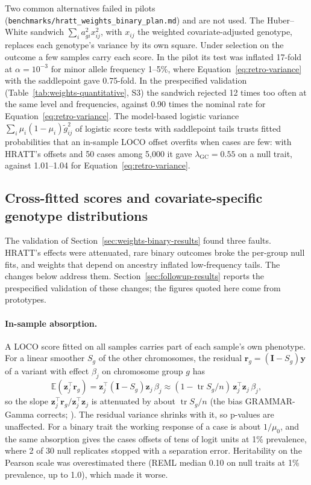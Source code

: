 \documentclass[11pt]{article}
\newcommand{\y}{\mathbf{y}}
\newcommand{\z}{\mathbf{z}}
\newcommand{\I}{\mathbf{I}}
\newcommand{\lgc}{\lambda_{\mathrm{GC}}}
\newcommand{\E}{\mathbb{E}}
\newcommand{\tr}{\operatorname{tr}}
\newcommand{\code}[1]{\texttt{#1}}
\begin{document}
Two common alternatives failed in pilots
(\code{benchmarks/}\allowbreak\code{hratt\_weights\_binary\_plan.md}) and are
not used. The
Huber--White sandwich $\sum_i a_{gi}^2x_{ij}^2$, with $x_{ij}$ the
weighted covariate-adjusted genotype, replaces each genotype's variance by
its own square. Under selection on the outcome a few samples carry each
score. In the pilot its test was inflated 17-fold at $\alpha=10^{-3}$ for
minor allele frequency 1--5\%, where Equation~\eqref{eq:retro-variance} with
the saddlepoint gave 0.75-fold. In the prespecified validation
(Table~\ref{tab:weights-quantitative}, S3) the sandwich rejected 12 times too
often at the same level and frequencies, against 0.90 times the nominal rate
for Equation~\eqref{eq:retro-variance}. The model-based logistic variance
$\sum_i\mu_i(1-\mu_i)\tilde g_{ij}^2$ of logistic score tests with
saddlepoint tails \citep{dey2017,zhou2018,hof2025} trusts fitted
probabilities that an in-sample LOCO offset overfits when cases are few:
with HRATT's offsets and 50 cases among 5,000 it gave $\lgc=0.55$ on a null
trait, against 1.01--1.04 for Equation~\eqref{eq:retro-variance}.

\subsection{Cross-fitted scores and covariate-specific genotype distributions}
\label{sec:crossfit}

The validation of Section~\ref{sec:weights-binary-results} found three
faults. HRATT's effects were attenuated, rare binary outcomes broke the
per-group null fits, and weights that depend on ancestry inflated
low-frequency tails. The changes below address them.
Section~\ref{sec:followup-results} reports the prespecified validation of
these changes; the figures quoted here come from prototypes.

\paragraph{In-sample absorption.}
A LOCO score fitted on all samples carries part of each sample's own
phenotype. For a linear smoother $S_g$ of the other chromosomes, the
residual $\mathbf r_g=(\I-S_g)\y$ of a variant with effect $\beta_j$ on
chromosome group $g$ has
\[
 \E(\z_j^\top\mathbf r_g)=\z_j^\top(\I-S_g)\z_j\,\beta_j
 \approx(1-\tr S_g/n)\,\z_j^\top\z_j\,\beta_j ,
\]
so the slope $\z_j^\top\mathbf r_g/\z_j^\top\z_j$ is attenuated by about
$\tr S_g/n$ (the bias GRAMMAR-Gamma corrects; \citealp{svishcheva2012}).
The residual variance shrinks with it, so p-values are unaffected. For a
binary trait the working response of a case is about $1/\mu_0$, and the
same absorption gives the cases offsets of tens of logit units at 1\%
prevalence, where 2 of 30 null replicates stopped with a separation error.
Heritability on the Pearson scale was overestimated there
(REML median 0.10 on null traits at 1\% prevalence, up to 1.0), which
made it worse.
\end{document}
